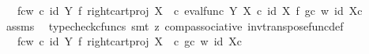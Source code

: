 \begin{isabellebody}
\ {\isachardoublequoteopen}{\isachardot}{\kern0pt}{\isachardot}{\kern0pt}{\isachardot}{\kern0pt}\ {\isacharequal}{\kern0pt}\ {\isacharparenleft}{\kern0pt}{\isacharparenleft}{\kern0pt}f{\isasymcirc}\isactrlsub cw{\isacharparenright}{\kern0pt}\isactrlsup {\isasymflat}\ {\isasymcirc}\isactrlsub c\ {\isacharparenleft}{\kern0pt}id\ {\isacharparenleft}{\kern0pt}Y{\isacharparenright}{\kern0pt}\ {\isasymtimes}\isactrlsub f\ right{\isacharunderscore}{\kern0pt}cart{\isacharunderscore}{\kern0pt}proj\ X\ {\isasymone}{\isacharparenright}{\kern0pt}\ {\isasymcirc}\isactrlsub c\ {\isasymlangle}eval{\isacharunderscore}{\kern0pt}func\ Y\ X\ {\isasymcirc}\isactrlsub c\ {\isacharparenleft}{\kern0pt}id\ X\ {\isasymtimes}\isactrlsub f\ {\isacharparenleft}{\kern0pt}g{\isasymcirc}\isactrlsub c\ w{\isacharparenright}{\kern0pt}{\isacharparenright}{\kern0pt}{\isacharcomma}{\kern0pt}\ id\ {\isacharparenleft}{\kern0pt}X{\isasymtimes}\isactrlsub c\ {\isasymone}{\isacharparenright}{\kern0pt}{\isasymrangle}{\isacharparenright}{\kern0pt}\isactrlsup {\isasymsharp}{\isachardoublequoteclose}\isanewline
\ \ \ \ \isamarkupfalse%
\ assms\ \isamarkupfalse%
\ {\isacharparenleft}{\kern0pt}typecheck{\isacharunderscore}{\kern0pt}cfuncs{\isacharcomma}{\kern0pt}\ smt\ {\isacharparenleft}{\kern0pt}z{}{\isacharparenright}{\kern0pt}\ comp{\isacharunderscore}{\kern0pt}associative{}\ inv{\isacharunderscore}{\kern0pt}transpose{\isacharunderscore}{\kern0pt}func{\isacharunderscore}{\kern0pt}def{}{\isacharparenright}{\kern0pt}\isanewline
\ \ \isamarkupfalse%
\ \isamarkupfalse%
\ {\isachardoublequoteopen}{\isachardot}{\kern0pt}{\isachardot}{\kern0pt}{\isachardot}{\kern0pt}\ {\isacharequal}{\kern0pt}\ {\isacharparenleft}{\kern0pt}{\isacharparenleft}{\kern0pt}f{\isasymcirc}\isactrlsub cw{\isacharparenright}{\kern0pt}\isactrlsup {\isasymflat}\ {\isasymcirc}\isactrlsub c\ {\isacharparenleft}{\kern0pt}id\ {\isacharparenleft}{\kern0pt}Y{\isacharparenright}{\kern0pt}\ {\isasymtimes}\isactrlsub f\ right{\isacharunderscore}{\kern0pt}cart{\isacharunderscore}{\kern0pt}proj\ X\ {\isasymone}{\isacharparenright}{\kern0pt}\ {\isasymcirc}\isactrlsub c\ {\isasymlangle}{\isacharparenleft}{\kern0pt}g{\isasymcirc}\isactrlsub c\ w{\isacharparenright}{\kern0pt}\isactrlsup {\isasymflat}{\isacharcomma}{\kern0pt}\ id\ {\isacharparenleft}{\kern0pt}X{\isasymtimes}\isactrlsub c\ {\isasymone}{\isacharparenright}{\kern0pt}{\isasymrangle}{\isacharparenright}{\kern0pt}\isactrlsup {\isasymsharp}{\isachardoublequoteclose}\isanewline
\ \ \ \ \isamarkupfalse%

\end{isabellebody}
